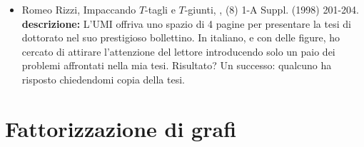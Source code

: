 \documentclass[10pt]{article}
\begin{document}
\begin{itemize}
\vspace{1.4mm}
  \item[] {\sc Romeo Rizzi},
   \newblock  Impaccando $T$-tagli e $T$-giunti,
   ,
             (8) 1-A Suppl. (1998) 201-204.\\
{\bf descrizione:}
L'UMI offriva uno spazio di 4 pagine per
presentare la tesi di dottorato nel suo prestigioso bollettino.
In italiano, e con delle figure,
ho cercato di attirare l'attenzione del lettore
introducendo solo un paio dei problemi affrontati
nella mia tesi.
Risultato? Un successo:
qualcuno ha risposto
chiedendomi copia della tesi.\\
\end{itemize}



\section{Fattorizzazione di grafi}
\end{document}
